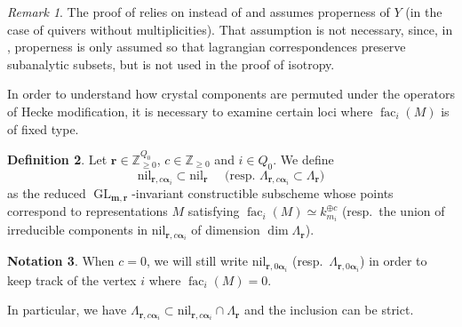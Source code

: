 \documentclass[a4paper,12pt]{article}
\theoremstyle{definition}
\newtheorem{definition}{Definition}[section]
\newtheorem{notation}[definition]{Notation}
\theoremstyle{plain}
\theoremstyle{remark}
\newtheorem{remark}[definition]{Remark}
\DeclareMathOperator{\fac}{fac}
\DeclareMathOperator{\GL}{GL}
\newcommand\bbZ{\mathbb{Z}}
\newcommand\bfalpha{\bm{\alpha}}
\newcommand\bfm{\mathbf{m}}
\newcommand\bfr{\mathbf{r}}
\begin{document}
\begin{remark}
The proof of \cite[Thm.\ 4.12]{S12b} relies on \cite[Prop.\ 8.3.11]{KS90} instead of \cite[Prop.\ 2.7.51]{CG97} and assumes properness of $Y$ (in the case of quivers without multiplicities). That assumption is not necessary, since, in \cite[Prop.\ 8.3.11]{KS90}, properness is only assumed so that lagrangian correspondences preserve subanalytic subsets, but is not used in the proof of isotropy.
\end{remark}

In order to understand how crystal components are permuted under the operators of Hecke modification, it is necessary to examine certain loci where $\fac_i(M)$ is of fixed type.

\begin{definition}\label{def/cokernelLoci}
Let $\bfr\in\bbZ_{\geq0}^{Q_0}$, $c\in\bbZ_{\geq0}$ and $i\in Q_0$. We define
\[
\mathrm{nil}_{\bfr,c\bfalpha_i}\subset\mathrm{nil}_\bfr \quad 
\text{ (resp. }
\Lambda_{\bfr,c\bfalpha_i}\subset\Lambda_\bfr
\text{)}
\]
as the reduced $\GL_{\bfm,\bfr}$-invariant constructible subscheme whose points correspond to representations $M$ satisfying $\fac_i(M)\simeq k_{m_i}^{\oplus c}$ (resp.\ the union of irreducible components in $\mathrm{nil}_{\bfr,c\bfalpha_i}$ of dimension $\dim\Lambda_\bfr$).
\end{definition}

\begin{notation}\label{Notation/0alpha_i}
When $c=0$, we will still write $\mathrm{nil}_{\bfr,0\bfalpha_i}$ (resp.\ $\Lambda_{\bfr,0\bfalpha_i}$) in order to keep track of the vertex $i$ where $\fac_i(M)=0$.
\end{notation}

In particular, we have $\Lambda_{\bfr,c\bfalpha_i}\subset\mathrm{nil}_{\bfr,c\bfalpha_i}\cap\Lambda_\bfr$ and the inclusion can be strict.
\end{document}
